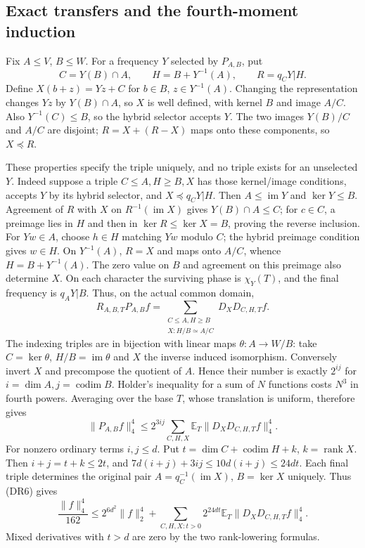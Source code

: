 \subsection{Exact transfers and the fourth-moment induction}
Fix $A\le V$, $B\le W$. For a frequency $Y$ selected by $P_{A,B}$,
put
\[
 C=Y(B)\cap A,\qquad H=B+Y^{-1}(A),\qquad R=q_CY|H.
\]
Define $X(b+z)=Yz+C$ for $b\in B$, $z\in Y^{-1}(A)$.
Changing the representation changes $Yz$ by $Y(B)\cap A$, so $X$ is
well defined, with kernel $B$ and image $A/C$. Also $Y^{-1}(C)\le B$,
so the hybrid selector accepts $Y$. The two images $Y(B)/C$ and $A/C$
are disjoint; $R=X+(R-X)$ maps onto these components, so $X\preceq R$.

These properties specify the triple uniquely, and no triple exists for
an unselected $Y$. Indeed suppose a triple $C\le A,H\ge B,X$ has those
kernel/image conditions, accepts $Y$ by its hybrid selector, and
$X\preceq q_CY|H$. Then $A\le\operatorname{im}Y$ and $\ker Y\le B$.
Agreement of $R$ with $X$ on $R^{-1}(\operatorname{im}X)$ gives
$Y(B)\cap A\le C$; for $c\in C$, a preimage lies in $H$ and then
in $\ker R\le\ker X=B$, proving the reverse inclusion.
For $Yw\in A$, choose $h\in H$ matching $Yw$ modulo $C$; the hybrid
preimage condition gives $w\in H$. On $Y^{-1}(A)$, $R=X$ and maps
onto $A/C$, whence $H=B+Y^{-1}(A)$. The zero value on $B$ and agreement
on this preimage also determine $X$.
On each character the surviving phase is $\chi_Y(T)$, and the final
frequency is $q_AY|B$. Thus, on the actual common domain,
\[
 R_{A,B,T}P_{A,B}f
   =\sum_{\substack{C\le A,H\ge B\\X:H/B\simeq A/C}}
            D_XD_{C,H,T}f.                            \tag{T1}
\]
The indexing triples are in bijection with linear maps
$\theta:A\to W/B$: take $C=\ker\theta$, $H/B=\operatorname{im}\theta$
and $X$ the inverse induced isomorphism. Conversely invert $X$ and
precompose the quotient of $A$. Hence their number is exactly
$2^{ij}$ for $i=\dim A,j=\operatorname{codim}B$.
Holder's inequality for a sum of $N$ functions costs $N^3$ in fourth
powers. Averaging over the base $T$, whose translation is uniform,
therefore gives
\[
 \|P_{A,B}f\|_4^4\le2^{3ij}
       \sum_{C,H,X}\mathbb E_T\|D_XD_{C,H,T}f\|_4^4.
\]
For nonzero ordinary terms $i,j\le d$. Put
$t=\dim C+\operatorname{codim}H+k$, $k=\operatorname{rank}X$.
Then $i+j=t+k\le2t$, and
$7d(i+j)+3ij\le10d(i+j)\le24dt$.
Each final triple determines the original pair
$A=q_C^{-1}(\operatorname{im}X)$, $B=\ker X$ uniquely. Thus (DR6) gives
\[
 \frac{\|f\|_4^4}{162}\le2^{6d^2}\|f\|_2^4+
  \sum_{C,H,X:t>0}2^{24dt}\mathbb E_T\|D_XD_{C,H,T}f\|_4^4.
                                                               \tag{A6}
\]
Mixed derivatives with $t>d$ are zero by the two rank-lowering formulas.

